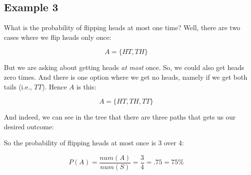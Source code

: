 \documentclass[../../../main.tex]{subfiles}
\begin{document}
\subsection{Example 3}

What is the probability of flipping heads at most one time? Well, there are two cases where we flip heads only once:

\begin{equation*}
  A = \{ HT, TH \}
\end{equation*}

\noindent
But we are asking about getting heads \emph{at most} once. So, we could also get heads zero times. And there is one option where we get no heads, namely if we get both tails (i.e., $TT$). Hence $A$ is this:

\begin{equation*}
  A = \{ HT, TH, TT \}
\end{equation*}

\noindent
And indeed, we can see in the tree that there are three paths that gets us our desired outcome:

\begin{center}
\end{center}

\noindent
So the probability of flipping heads at most once is 3 over 4:

\begin{equation*}
  P(A) = \frac{num(A)}{num(S)} = \frac{3}{4} = .75 = 75\%
\end{equation*}
\end{document}
